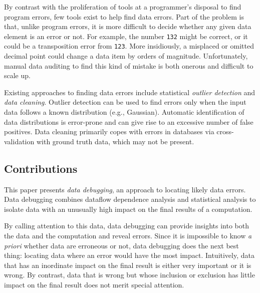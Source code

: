 


By contrast with the proliferation of tools at a programmer's disposal
to find program errors, few tools exist to help find data errors. Part
of the problem is that, unlike program errors, it is more difficult to
decide whether any given data element is an error or not. For example,
the number \texttt{132} might be correct, or it could be a
transposition error from \texttt{123}. More insidiously, a misplaced
or omitted decimal point could change a data item by orders of
magnitude. Unfortunately, manual data auditing to find this kind of
mistake is both onerous and difficult to scale up.



Existing approaches to finding data errors include
statistical \emph{outlier detection} and \emph{data cleaning}. Outlier
detection can be used to find errors only when the input data follows
a known distribution (e.g., Gaussian). Automatic identification of
data distributions is error-prone and can give rise to an excessive
number of false positives. Data cleaning primarily copes with errors
in databases via cross-validation with ground truth data, which may
not be present.

\subsection*{Contributions}


This paper presents \emph{data debugging}, an approach to locating
likely data errors.  Data debugging combines dataflow dependence
analysis and statistical analysis to isolate data with an
unusually high impact on the final results of a computation.

By calling attention to this data, data debugging can provide insights
into both the data and the computation and reveal errors. Since it
is impossible to know \emph{a priori} whether data are erroneous or
not, data debugging does the next best thing: locating data where an
error would have the most impact. Intuitively, data that has an
inordinate impact on the final result is either very important or
it is wrong. By contrast, data that is wrong but whose inclusion or
exclusion has little impact on the final result does not merit special
attention.

